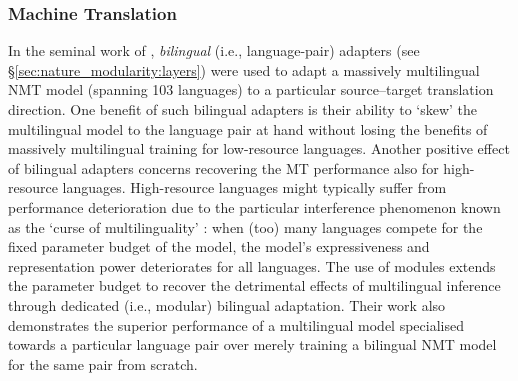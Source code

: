 \documentclass[10pt]{article} %
\begin{document}
 

\subsubsection{Machine Translation}
\label{ss:nmt}

In the seminal work of \citet{Bapna2019Adapters}, \textit{bilingual} (i.e., language-pair) adapters (see \S\ref{sec:nature_modularity:layers}) were used to adapt a massively multilingual NMT model (spanning 103 languages) to a particular source--target translation direction. One benefit of such bilingual adapters is their ability to `skew' the multilingual model to the language pair at hand without losing the benefits of massively multilingual training for low-resource languages. Another positive effect of bilingual adapters concerns recovering the MT performance also for high-resource languages. High-resource languages might typically suffer from performance deterioration due to the particular interference phenomenon known as the `curse of multilinguality' \citep{conneau-etal-2020-unsupervised,wang-etal-2020-negative}: when (too) many languages compete for the fixed parameter budget of the model, the model's expressiveness and representation power deteriorates for all languages. The use of modules extends the parameter budget to recover the detrimental effects of multilingual inference through dedicated (i.e., modular) bilingual adaptation.  
Their work also demonstrates the superior performance of a multilingual model specialised towards a particular language pair over merely training a bilingual NMT model for the same pair from scratch.
\end{document}
